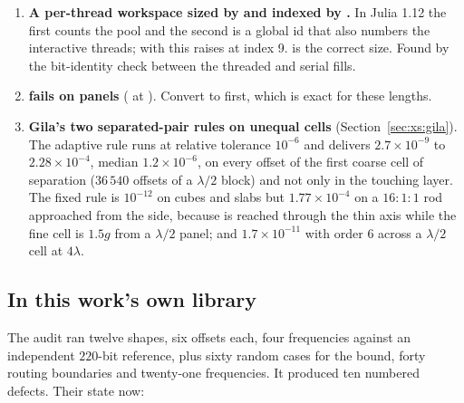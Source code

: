 \begin{enumerate}[leftmargin=1.6em]
the triangle weight kills every odd $l$, and mandatory on a sub-box, where the affine weight
does not: omitting it is a $3.7\times10^{-2}$ error. The library folds it into the frequency
contraction for both tables, so the two paths cannot diverge.
\item \textbf{A per-thread workspace sized by  and indexed by
.} In Julia 1.12 the first counts the  pool and the second is
a global id that also numbers the interactive threads; with 
this raises  at index 9.  is the correct size. Found by
the bit-identity check between the threaded and serial fills.
\item \textbf{ fails on  panels}
( at ). Convert to  first, which is exact for
these lengths.
\item \textbf{Gila's two separated-pair rules on unequal cells} (Section~\ref{sec:xs:gila}).
The adaptive rule  runs  at relative tolerance $10^{-6}$
and delivers $2.7\times10^{-9}$ to $2.28\times10^{-4}$, median $1.2\times10^{-6}$, on
every offset of the first coarse cell of separation ($36\,540$ offsets of a $\lambda/2$
block) and not only in the touching layer. The fixed rule  is
$10^{-12}$ on cubes and slabs but $1.77\times10^{-4}$ on a $16{:}1{:}1$ rod approached
from the side, because  is reached through the thin axis while the fine cell is
$1.5g$ from a $\lambda/2$ panel; and $1.7\times10^{-11}$ with order $6$ across a
$\lambda/2$ cell at $4\lambda$.
\end{enumerate}

\subsection{In this work's own library}

The audit ran twelve shapes, six offsets each, four frequencies against an independent
$220$-bit reference, plus sixty random cases for the bound, forty routing boundaries and
twenty-one frequencies. It produced ten numbered defects. Their state now:

